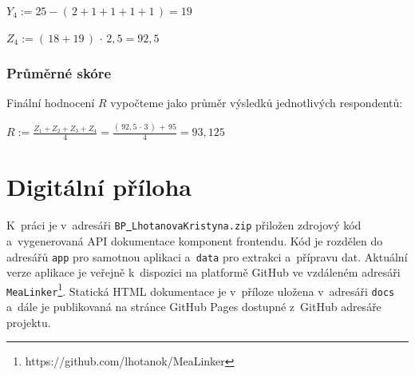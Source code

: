\documentclass[12pt,a4paper]{report}
\let\openright=\clearpage
\begin{document}
$Y_4 := 25 - (\,2 + 1 + 1 + 1 + 1\,) = 19\,$

$Z_4 := ( \,18 + 19\,)\,\cdot\,2,5 = 92,5$

\subsubsection{Průměrné skóre}

Finální hodnocení $R$ vypočteme jako průměr výsledků jednotlivých respondentů:

$R := \frac{Z_1 + Z_2 + Z_3 + Z_4}{4} = \frac{(\,92,5\,\cdot\,3\,)\,+\,95}{4} = 93,125$

\section{Digitální příloha}

K~práci je v~adresáři \texttt{BP\underline{{ }}LhotanovaKristyna.zip} přiložen zdrojový kód a~vygenerovaná API dokumentace komponent frontendu. Kód je rozdělen do adresářů \texttt{app} pro samotnou aplikaci a~\texttt{data} pro extrakci a~přípravu dat. Aktuální verze aplikace je veřejně k~dispozici na platformě GitHub ve vzdáleném adresáři \texttt{MeaLinker}\footnote{https://github.com/lhotanok/MeaLinker}. Statická HTML dokumentace je v~příloze uložena v~adresáři \texttt{docs} a~dále je publikovaná na stránce GitHub Pages dostupné z~GitHub adresáře projektu.

\openright
\end{document}
